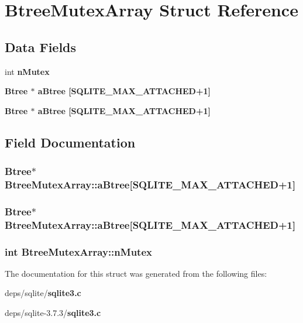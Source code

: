 \section{Btree\-Mutex\-Array Struct Reference}
\label{structBtreeMutexArray}
\subsection*{Data Fields}
\begin{CompactItemize}
\item 
int \bf{n\-Mutex}
\item 
\bf{Btree} $\ast$ \bf{a\-Btree} [SQLITE\_\-MAX\_\-ATTACHED+1]
\item 
\bf{Btree} $\ast$ \bf{a\-Btree} [SQLITE\_\-MAX\_\-ATTACHED+1]
\end{CompactItemize}


\subsection{Field Documentation}
\subsubsection{\setlength{\rightskip}{0pt plus 5cm}\bf{Btree}$\ast$ \bf{Btree\-Mutex\-Array::a\-Btree}[SQLITE\_\-MAX\_\-ATTACHED+1]}\label{structBtreeMutexArray_3f915e81b802ac9a6b2282565abd7e27}


\subsubsection{\setlength{\rightskip}{0pt plus 5cm}\bf{Btree}$\ast$ \bf{Btree\-Mutex\-Array::a\-Btree}[SQLITE\_\-MAX\_\-ATTACHED+1]}\label{structBtreeMutexArray_3f915e81b802ac9a6b2282565abd7e27}


\subsubsection{\setlength{\rightskip}{0pt plus 5cm}int \bf{Btree\-Mutex\-Array::n\-Mutex}}\label{structBtreeMutexArray_6c2dbddb32a4d73d6b6889f8144d2800}




The documentation for this struct was generated from the following files:\begin{CompactItemize}
\item 
deps/sqlite/\bf{sqlite3.c}\item 
deps/sqlite-3.7.3/\bf{sqlite3.c}\end{CompactItemize}
